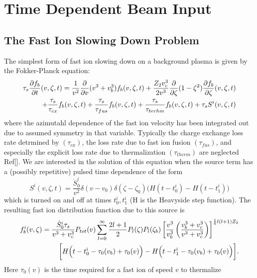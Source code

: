 \section{Time Dependent Beam Input}

\subsection{The Fast Ion Slowing Down Problem}

The simplest form of fast ion slowing down on a background plasma is given by
the Fokker-Planck equation:
\begin{eqnarray}
 \tau_s \frac{\partial{ f_b}}{\partial{ t}}(v,\zeta,t) = \frac{1}{v^2} 
 \frac{\partial}{\partial v}{(v^3+v_b^3)} f_b(v,\zeta,t) +\frac{Z_2v_c^3}{2 v^3}
 \frac{\partial}{\partial \zeta}{(1-\zeta^2)}  \frac{\partial{ f_b}}{\partial{ \zeta}}(v,\zeta,t)\nonumber \\  
 + \frac{\tau_s}{\tau_{cx}}f_b(v,\zeta,t) +
 \frac{\tau_s}{\tau_{fus}}f_b(v,\zeta,t) +
 \frac{\tau_s}{\tau_{terhm}}f_b(v,\zeta,t) +
 \tau_s S^i(v,\zeta,t)
 \label{eq:wav2}
\end{eqnarray}
where the azimutahl dependence of the fast ion velocity has been integrated out
due to assumed symmetry in that variable. Typically the charge exchange loss
rate detrmined by $(\tau_{cx})$, the loss rate due to fast ion fusion
$(\tau_{fus})$, and especially the explicit loss rate due to thermalization
$(\tau_{therm})$ are neglected Ref[]. We are interested in the solution of this
equation when the  source term has a (possibly repetitive) pulsed time
dependence of the form
\begin{equation} \label{eq:wav1}
 S^i(v,\zeta,t)= \frac{\dot S_0^i}{v^2}\delta(v-v_0) \delta(\zeta-\zeta_0) 
 \biggl( H(t-t_0^i) - H(t-t_1^i) \biggr)
\end{equation}
which is turned on and off at times  $t_0^i ,t_1^i $ (H is
the Heavyside step function).
The resulting fast ion distribution function due to this
source is
\begin{eqnarray}  %
 f_b^i(v,\zeta)= \frac{\dot S_0^i \tau_s}{v^3+v_c^3} P_{tot}(v)
 \sum_{l=0}^{\infty}\frac{2l+1}{2}P_l(\zeta)P_l(\zeta_b)
 \left[\frac{v^3}{v_b^3} \left(\frac{v_b^3+v_c^3}{v^3+v_c^3}
 \right)\right]^{\frac{1}{6}l(l+1)Z_2} \nonumber \\  
 \bigg[
 H\Bigl(t-t_0^i - \tau_0(v_b)+\tau_0(v) \Bigr)
 -H\Bigl(t-t_1^i - \tau_0(v_b)+\tau_0(v) \Bigr)
 \bigg]
 \label{eq:wav3a}.
\end{eqnarray}
Here $\tau_0(v)$ is the time required for a fast ion of speed $v$ to thermalize
